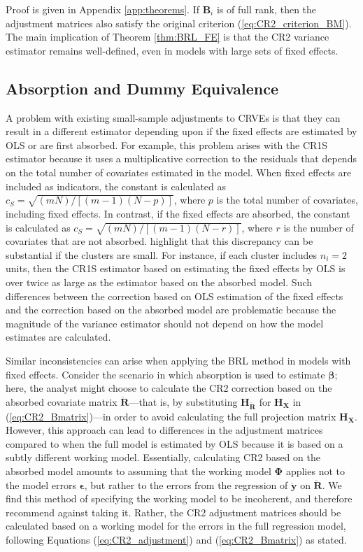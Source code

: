 \documentclass[12pt]{article}
\newcommand{\bm}{\mathbf}
\newcommand{\bs}{\boldsymbol}
\begin{document}
Proof is given in Appendix \ref{app:theorems}. If $\bm{B}_i$ is of full rank, then the adjustment matrices also satisfy the original criterion (\ref{eq:CR2_criterion_BM}). The main implication of Theorem \ref{thm:BRL_FE} is that the CR2 variance estimator remains well-defined, even in models with large sets of fixed effects.

\subsection{Absorption and Dummy Equivalence}

A problem with existing small-sample adjustments to CRVEs is that they can result in a different estimator depending upon if the fixed effects are estimated by OLS or are first absorbed. 
For example, this problem arises with the CR1S estimator because it uses a multiplicative correction to the residuals that depends on the total number of covariates estimated in the model. 
When fixed effects are included as indicators, the constant is calculated as $c_S = \sqrt{(mN) / [(m - 1)(N - p)]}$, where $p$ is the total number of covariates, including fixed effects. 
In contrast, if the fixed effects are absorbed, the constant is calculated as $c_S = \sqrt{(mN) / [(m - 1)(N - r)]}$, where $r$ is the number of covariates that are not absorbed. 
\citet{Cameron2015practitioners} highlight that this discrepancy can be substantial if the clusters are small. For instance, if each cluster includes $n_i = 2$ units, then the CR1S estimator based on estimating the fixed effects by OLS is over twice as large as the estimator based on the absorbed model.
Such differences between the correction based on OLS estimation of the fixed effects and the correction based on the absorbed model are problematic because the magnitude of the variance estimator should not depend on how the model estimates are calculated. 

Similar inconsistencies can arise when applying the BRL method in models with fixed effects. 
Consider the scenario in which absorption is used to estimate $\bs\beta$; here, the analyst might choose to calculate the CR2 correction based on the absorbed covariate matrix $\bm{\ddot{R}}$---that is, by substituting $\bm{H_{\ddot{R}}}$ for $\bm{H_X}$ in (\ref{eq:CR2_Bmatrix})---in order to avoid calculating the full projection matrix $\bm{H_X}$. 
However, this approach can lead to differences in the adjustment matrices compared to when the full model is estimated by OLS because it is based on a subtly different working model. 
Essentially, calculating CR2 based on the absorbed model amounts to assuming that the working model $\bs\Phi$ applies not to the model errors $\bs\epsilon$, but rather to the errors from the regression of $\bm{\ddot{y}}$ on $\bm{\ddot{R}}$.
We find this method of specifying the working model to be incoherent, and therefore recommend against taking it.
Rather, the CR2 adjustment matrices should be calculated based on a working model for the errors in the full regression model, following Equations (\ref{eq:CR2_adjustment}) and (\ref{eq:CR2_Bmatrix}) as stated. 
\end{document}
